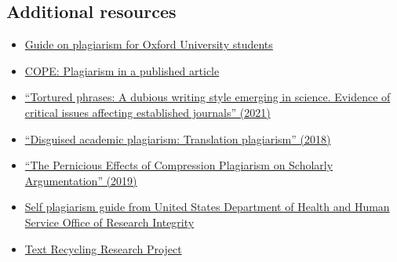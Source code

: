 \documentclass[letterpaper, 12pt]{article}
\begin{document}
\subsection*{Additional resources}

\begin{itemize}
    \setlength\itemsep{-0.5em}
    \item \href{https://www.ox.ac.uk/students/academic/guidance/skills/plagiarism}{Guide on plagiarism for Oxford University students}
    \item \href{https://doi.org/10.24318/cope.2019.2.2}{COPE: Plagiarism in a published article}
    \item \href{https://doi.org/10.48550/arXiv.2107.06751}{``Tortured phrases: A dubious writing style emerging in science. Evidence of critical issues affecting established journals'' (2021)}
    \item \href{https://doi.org/10.1007/978-3-030-46711-1_2}{``Disguised academic plagiarism: Translation plagiarism'' (2018)}
    \item \href{https://doi.org/10.1007/s10503-019-09481-3}{``The Pernicious Effects of Compression Plagiarism on Scholarly Argumentation'' (2019)}
    \item \href{https://ori.hhs.gov/self-plagiarism}{Self plagiarism guide from United States Department of Health and Human Service Office of Research Integrity}
    \item \href{https://textrecycling.org/}{Text Recycling Research Project}
\end{itemize}
\end{document}
